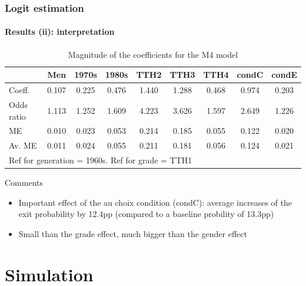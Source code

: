 \documentclass[xcolor=table,ignorenonframetext,12pt]{beamer}
\newenvironment{choixmarges}[2]{\begin{list}{}{%
\setlength{\topsep}{0pt}%
\setlength{\leftmargin}{0pt}%
\setlength{\rightmargin}{0pt}%
\setlength{\listparindent}{\parindent}%
\setlength{\itemindent}{\parindent}%
\setlength{\parsep}{0pt plus 1pt}%
\addtolength{\leftmargin}{#1}%
\addtolength{\rightmargin}{#2}%
}\item }{\end{list}}
\begin{document}
\begin{frame}
\frametitle{Logit estimation}
\framesubtitle{Results (ii): interpretation}


\vspace{-0.2cm}

\begin{choixmarges}{-0.7cm}{-0.7cm}

\begin{table}
\centering
\begingroup\footnotesize
\caption{Magnitude of the coefficients for the M4 model}
\vspace{-0.3cm}
\begin{tabular}{lcccccccc}
  \hline
 & Men & 1970s & 1980s & TTH2 & TTH3 & TTH4 & condC & condE \\ 
  \hline
Coeff. & 0.107 & 0.225 & 0.476 & 1.440 & 1.288 & 0.468 & 0.974 & 0.203 \\ 
Odds ratio & 1.113 & 1.252 & 1.609 & 4.223 & 3.626 & 1.597 & 2.649 & 1.226 \\ 
ME & 0.010 & 0.023 & 0.053 & 0.214 & 0.185 & 0.055 & 0.122 & 0.020 \\ 
  Av. ME & 0.011 & 0.024 & 0.055 & 0.211 & 0.181 & 0.056 & 0.124 & 0.021 \\ 
   \hline
\multicolumn{9}{l}{\scriptsize{Ref for generation = 1960s. Ref for grade = TTH1}} \\
\end{tabular}
\endgroup
\end{table}
\end{choixmarges}

\vspace{0.2cm}

Comments
\begin{itemize}
\item  Important effect of the \og au choix \fg{} condition (condC): average increases of the exit probability by 12.4pp (compared to a baseline probility of 13.3pp)
\item  Small than the grade effect, much bigger than the gender effect 
\end{itemize}




\end{frame}

\section{Simulation}
\end{document}
